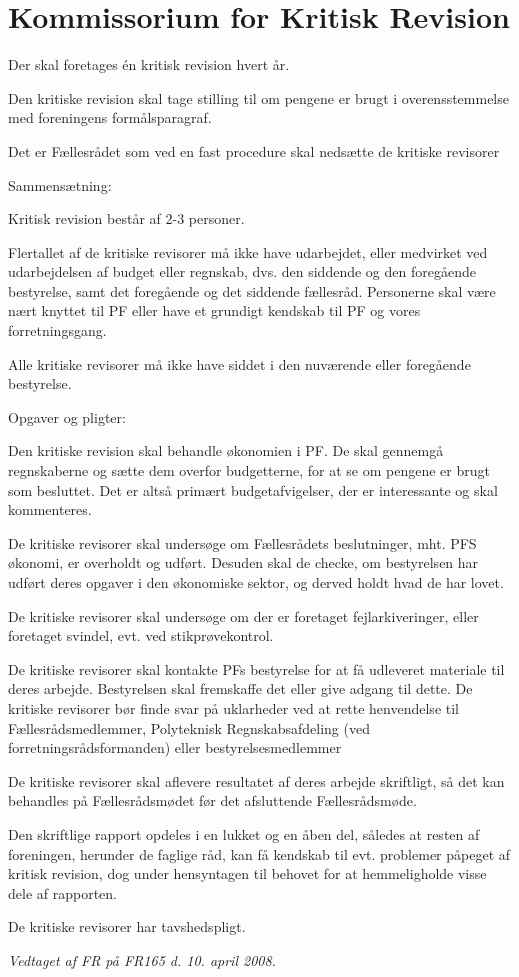 \section{Kommissorium for Kritisk Revision}

\begin{list}{•}
\item Der skal foretages én kritisk revision hvert år.
\item Den kritiske revision skal tage stilling til om pengene er brugt i overensstemmelse med foreningens formålsparagraf.
\item Det er Fællesrådet som ved en fast procedure skal nedsætte de kritiske revisorer
\end{list}

Sammensætning:
\begin{list}{•}
\item Kritisk revision består af 2-3 personer.
\item Flertallet af de kritiske revisorer må ikke have udarbejdet, eller medvirket ved udarbejdelsen af budget eller regnskab, dvs. den siddende og den foregående bestyrelse, samt det foregående og det siddende fællesråd. Personerne skal være nært knyttet til PF eller have et grundigt kendskab til PF og vores forretningsgang.
\item Alle kritiske revisorer må ikke have siddet i den nuværende eller foregående bestyrelse.
\end{list}
Opgaver og pligter:
\begin{list}{•}
\item Den kritiske revision skal behandle økonomien i PF. De skal gennemgå regnskaberne og sætte dem overfor
budgetterne, for at se om pengene er brugt som besluttet. Det er altså primært budgetafvigelser, der er
interessante og skal kommenteres.
\item De kritiske revisorer skal undersøge om Fællesrådets beslutninger, mht. PFS økonomi, er overholdt og udført.
Desuden skal de checke, om bestyrelsen har udført deres opgaver i den økonomiske sektor, og derved holdt
hvad de har lovet.
\item De kritiske revisorer skal undersøge om der er foretaget fejlarkiveringer, eller foretaget svindel, evt. ved
stikprøvekontrol.
\item De kritiske revisorer skal kontakte PFs bestyrelse for at få udleveret materiale til deres arbejde. Bestyrelsen
skal fremskaffe det eller give adgang til dette. De kritiske revisorer bør finde svar på uklarheder ved at rette
henvendelse til Fællesrådsmedlemmer, Polyteknisk Regnskabsafdeling (ved forretningsrådsformanden) eller
bestyrelsesmedlemmer
\item De kritiske revisorer skal aflevere resultatet af deres arbejde skriftligt, så det kan behandles på
Fællesrådsmødet før det afsluttende Fællesrådsmøde.
\item Den skriftlige rapport opdeles i en lukket og en åben del, således at resten af foreningen, herunder de faglige
råd, kan få kendskab til evt. problemer påpeget af kritisk revision, dog under hensyntagen til behovet for at
hemmeligholde visse dele af rapporten.
\item De kritiske revisorer har tavshedspligt.
\end{list}

\textit{Vedtaget af FR på FR165 d. 10. april 2008.}
